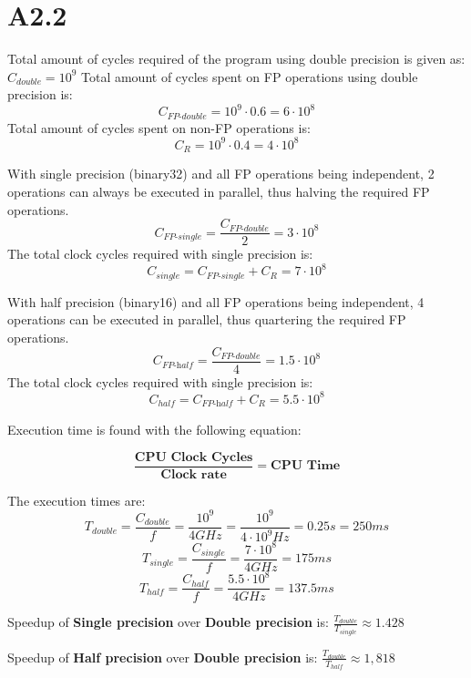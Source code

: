 \section*{A2.2}

Total amount of cycles required of the program using double precision is given as: $C_{double} = 10^9$
Total amount of cycles spent on FP operations using double precision is: 
$$ C_{\textit{FP-double}} = 10^9 \cdot 0.6 = 6 \cdot 10^8 $$
Total amount of cycles spent on non-FP operations is:
$$ C_R = 10^9 \cdot 0.4 = 4 \cdot 10^8 $$


With single precision (binary32) and all FP operations being independent, 2 operations can always be executed in parallel, thus halving the required FP operations.
$$ C_{\textit{FP-single}} = \frac{C_{\textit{FP-double}}}{2} = 3 \cdot 10^8 $$
The total clock cycles required with single precision is: 
$$ C_{single} = C_{\textit{FP-single}} + C_R = 7 \cdot 10^8 $$


With half precision (binary16) and all FP operations being independent, 4 operations can be executed in parallel, thus quartering the required FP operations.
$$ C_{\textit{FP-half}} = \frac{C_{\textit{FP-double}}}{4} = 1.5 \cdot 10^8 $$
The total clock cycles required with single precision is: 
$$ C_{half} = C_{\textit{FP-half}} + C_R = 5.5 \cdot 10^8 $$

Execution time is found with the following equation:

$$ \frac{\textbf{CPU Clock Cycles}}{\textbf{Clock rate}} = \textbf{CPU Time} $$

The execution times are:
$$T_{double} = \frac{C_{double}}{f} = \frac{10^9}{4 \textit{GHz}} = \frac{10^9}{4 \cdot 10^9 \textit{Hz}} = 0.25 \textit{s} = 250 \textit{ms}$$
$$T_{single} = \frac{C_{single}}{f} = \frac{7 \cdot 10^8}{4 \textit{GHz}} = 175 \textit{ms}$$
$$T_{half} = \frac{C_{half}}{f} = \frac{5.5 \cdot 10^8}{4 \textit{GHz}} = 137.5 \textit{ms}$$


Speedup of \textbf{Single precision} over \textbf{Double precision} is: $ \frac{T_{double}}{T_{single}} \approx 1.428 $

Speedup of \textbf{Half precision} over \textbf{Double precision} is: $ \frac{T_{double}}{T_{half}} \approx 1,818 $

\newpage